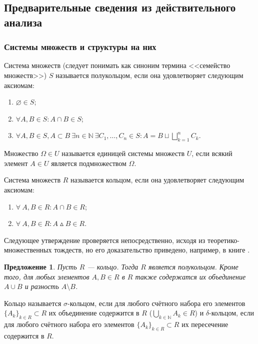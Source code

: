 \documentclass[12pt]{article}
\newtheorem{proposition}[theorem]{Предложение}
\numberwithin{theorem}{section}
\theoremstyle{definition}
\newcommand{\defin}[2]{\hypertarget{#2}{{\color{red} #1}}}
\begin{document}
	\subsection{Предварительные сведения из действительного анализа}
	
	\subsubsection{Системы множеств и структуры на них}
	
	Система множеств (следует понимать как синоним термина <<семейство множеств>>) $ S $ 
	называется \defin{полукольцом}{semiring}, если она удовлетворяет следующим аксиомам:
	\begin{enumerate}
		\item $ \varnothing \in S $;
		\item $ \forall A, B \in S: A \cap B \in S $;
		\item $ \forall A, B \in S, A \subset B \ \exists n \in \mathbb{N} \ \exists C_1, \ldots, C_n \in S: 
		A = B \sqcup \bigsqcup\limits_{k = 1}^{n} C_k  $.
	\end{enumerate}
	
	Множество $ \Omega \in U $ называется \defin{единицей системы множеств $ U $}{unit},
	если всякий элемент $ A \in U $ является подмножеством $ \Omega $.
	
	Система множеств $ R $ называется \defin{кольцом}{ring}, если она удовлетворяет следующим аксиомам:
	\begin{enumerate}
		\item $ \forall \ A, B \in R: A \cap B \in R $;
		\item $ \forall \ A, B \in R: A \vartriangle B \in R $.
	\end{enumerate}
	
	Следующее утверждение проверяется непосредственно, исходя из теоретико-множественных тождеств,
	но его доказательство приведено, например, в книге \cite{DiyachenoUliyanov}.
	
	\begin{proposition}
		Пусть $ R $ --- кольцо. Тогда $ R $ является полукольцом.
		Кроме того, для любых элементов $ A, B \in R $ в $ R $ также содержатся их объединение $ A \cup B $
		и разность $ A \setminus B $. 
	\end{proposition}
	
	Кольцо называется \defin{$ \sigma $-кольцом}{sigma-ring}, если 
	для любого счётного набора его элементов $ \{A_k\}_{k \in R} \subset R $ их объединение содержится в $ R $
	($ \bigcup\limits_{k \in \mathbb{N}} A_k \in R $)
	и \defin{$ \delta $-кольцом}{delta-ring},
	если для любого счётного набора его элементов $ \{A_k\}_{k \in R} \subset R $ их пересечение содержится в $ R $.
	
\end{document}
